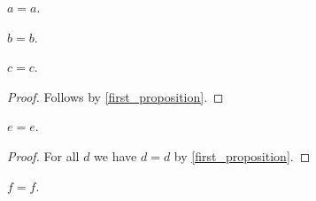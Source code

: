 \begin{proposition}\label{first_proposition}
    $a = a$.
\end{proposition}

\begin{proposition}\label{second_proposition}
    $b = b$.
\end{proposition}

\begin{proposition}\label{third_proposition}
    $c = c$.
\end{proposition}
\begin{proof}
    Follows by \ref{first_proposition}. %
\end{proof}

\begin{proposition}\label{fourth_proposition}
    $e = e$.
\end{proposition}
\begin{proof}
    For all $d$ we have $d = d$ by \ref{first_proposition}.
\end{proof}

\begin{proposition}\label{fifth_proposition}
    $f = f$.
\end{proposition}
